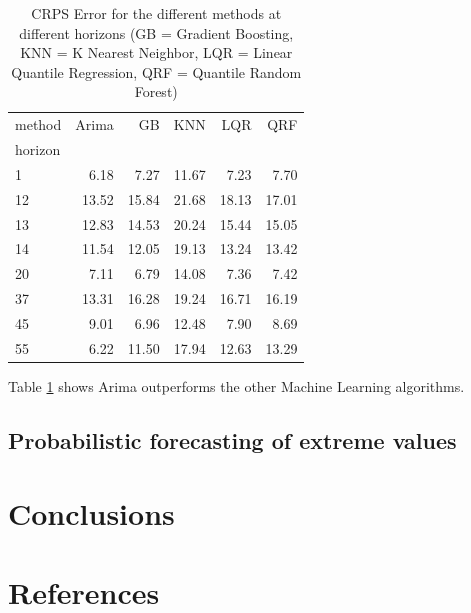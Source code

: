 \documentclass[a4paper,twocolumn,5p]{elsarticle}
\begin{document}
\begin{table}[tbp]
  \centering
  \label{tab:determ}
  \caption{CRPS Error for the different methods at different
    horizons (GB = Gradient Boosting,
    KNN = K Nearest Neighbor,
    LQR = Linear Quantile Regression,
    QRF = Quantile Random Forest)
    }
    \begin{tabular}{lrrrrr}
      \toprule
      method &  Arima &    GB &   KNN &   LQR &    QRF \\
      horizon &        &       &       &       &       \\
      \midrule
      1       &   6.18 &  7.27 & 11.67 &  7.23 &  7.70 \\
      12      &  13.52 & 15.84 & 21.68 & 18.13 & 17.01 \\
      13      &  12.83 & 14.53 & 20.24 & 15.44 & 15.05 \\
      14      &  11.54 & 12.05 & 19.13 & 13.24 & 13.42 \\
      20      &   7.11 &  6.79 & 14.08 &  7.36 &  7.42 \\
      37      &  13.31 & 16.28 & 19.24 & 16.71 & 16.19 \\
      45      &   9.01 &  6.96 & 12.48 &  7.90 &  8.69 \\
      55      &   6.22 & 11.50 & 17.94 & 12.63 & 13.29 \\
      \bottomrule
      \end{tabular}
  
\end{table}


Table \ref{tab:determ} shows Arima outperforms the other Machine Learning algorithms.

\subsection{Probabilistic forecasting of extreme values}
\label{sec:probabilistic}

\cite{qxgb}

\section{Conclusions}
\label{sec:concl}

\section*{References}


\end{document}
